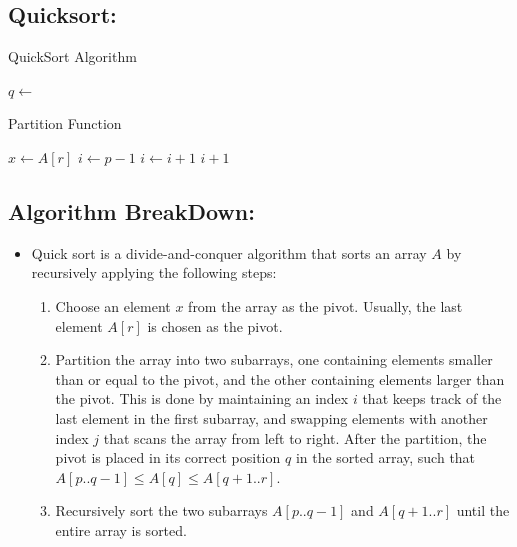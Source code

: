 \documentclass[a4paper, 9pt, twocolumn]{article}
\begin{document}
\subsection*{Quicksort:}

\begin{algorithm}
  \caption{QuickSort Algorithm}
  \begin{algorithmic}[1]
    \State $q \gets$ 
    \State {}
    \State {}
    \EndIf
    \EndFunction
  \end{algorithmic}
\end{algorithm}

\begin{algorithm}
  \caption{Partition Function}
  \begin{algorithmic}[1]
    \State $x \gets A[r]$
    \State $i \gets p-1$
    \State $i \gets i+1$
    \State {}
    \EndIf
    \EndFor
    \State {}
    \State \Return $i+1$
    \EndFunction
  \end{algorithmic}
\end{algorithm}


\subsection*{Algorithm BreakDown:}
\begin{itemize}
  \item Quick sort is a divide-and-conquer algorithm that sorts an array $A$ by recursively applying the following steps:\\
        \begin{enumerate}
          \item Choose an element $x$ from the array as the pivot. Usually, the last element $A[r]$ is chosen as the pivot.
          \item Partition the array into two subarrays, one containing elements smaller than or equal to the pivot, and the other containing elements larger than the pivot. This is done by maintaining an index $i$ that keeps track of the last element in the first subarray, and swapping elements with another index $j$ that scans the array from left to right. After the partition, the pivot is placed in its correct position $q$ in the sorted array, such that $A[p..q-1] \leq A[q] \leq A[q+1..r]$.
          \item Recursively sort the two subarrays $A[p..q-1]$ and $A[q+1..r]$ until the entire array is sorted.
        \end{enumerate}
\end{itemize}
\end{document}
